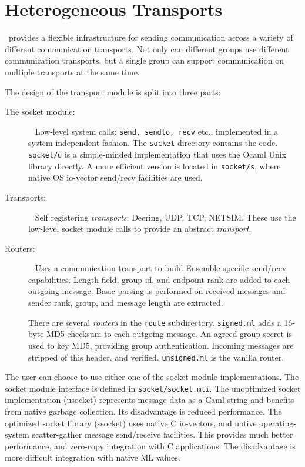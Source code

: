 \newcommand{\sourcefile}[1]    {{\tt {#1}}}

\section{Heterogeneous Transports}

\ensemble\ provides a flexible infrastructure for sending communication
across a variety of different communication transports.  Not only can
different groups use different communication transports, but a single group
can support communication on multiple transports at the same time.

The design of the transport module is split into three parts: 
\begin{description}
\item[The socket module:] ~\newline
   Low-level system calls: {\tt send, sendto, recv} etc.,
  implemented in a system-independent fashion. The {\tt socket}
  directory contains the code. {\tt socket/u} is a simple-minded
  implementation that uses the Ocaml Unix library directly. A more
  efficient version is located in {\tt socket/s}, where native OS
  io-vector send/recv facilities are used. 

\item[Transports:] ~\newline
  Self registering {\it transports}:  Deering, UDP, TCP, NETSIM. These
  use the low-level socket module calls to provide an abstract {\it transport}.
	
\item[Routers:] ~\newline
  Uses a communication transport to
  build Ensemble specific send/recv capabilities. Length field, 
  group id, and endpoint rank are added to each outgoing
  message. Basic parsing is performed on received messages and sender
  rank, group, and message length are extracted. 
 
  There are several {\it routers} in the {\tt route}
  subdirectory. \sourcefile{signed.ml} adds a 16-byte MD5 checksum to
  each outgoing message. An agreed group-secret is used to key MD5,
  providing group authentication. Incoming messages are stripped of
  this header, and verified. \sourcefile{unsigned.ml} is the vanilla router.

\end{description}

The user can choose to use either one of the socket module
implementations. The socket module interface is defined in
\sourcefile{socket/socket.mli}. The unoptimized socket implementation
(usocket) represents message data as a Caml string and benefits from
native garbage collection. Its disadvantage is reduced
performance. The optimized socket library (ssocket) uses native C
io-vectors, and native operating-system scatter-gather message
send/receive facilities. This provides much better performance, and
zero-copy integration with C applications. The disadvantage is more
difficult integration with native ML values. 

